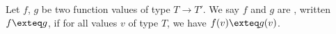 \begin{node}\label{sml-000A}%
Let $f$, $g$ be two function values of type $T\to T'$.
We say $f$ and $g$ are , written
$f\exteq g$, if for all values $v$ of type $T$, we have $f(v)\exteq g(v)$.
\end{node}
